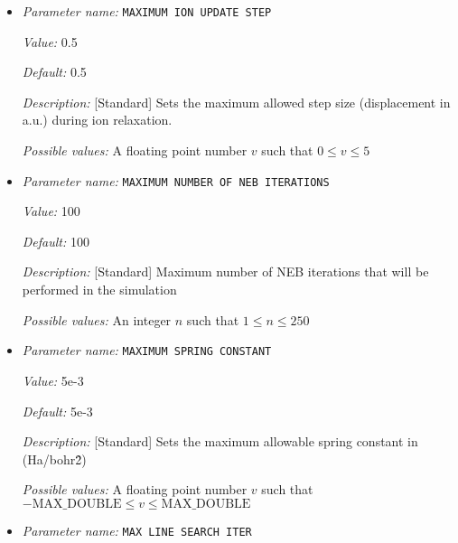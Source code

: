 \begin{itemize}
{\it Value:} 5


{\it Default:} 5


{\it Description:} [Standard] Number of previous steps to considered for the LBFGS update.


{\it Possible values:} An integer $n$ such that $1\leq n \leq 20$
\item {\it Parameter name:} {\tt MAXIMUM ION UPDATE STEP}
\label{parameters:NEB/MAXIMUM ION UPDATE STEP}
\label{parameters:NEB/MAXIMUM_20ION_20UPDATE_20STEP}


{\it Value:} 0.5


{\it Default:} 0.5


{\it Description:} [Standard] Sets the maximum allowed step size (displacement in a.u.) during ion relaxation.


{\it Possible values:} A floating point number $v$ such that $0 \leq v \leq 5$
\item {\it Parameter name:} {\tt MAXIMUM NUMBER OF NEB ITERATIONS}
\label{parameters:NEB/MAXIMUM NUMBER OF NEB ITERATIONS}
\label{parameters:NEB/MAXIMUM_20NUMBER_20OF_20NEB_20ITERATIONS}


{\it Value:} 100


{\it Default:} 100


{\it Description:} [Standard] Maximum number of NEB iterations that will be performed in the simulation


{\it Possible values:} An integer $n$ such that $1\leq n \leq 250$
\item {\it Parameter name:} {\tt MAXIMUM SPRING CONSTANT}
\label{parameters:NEB/MAXIMUM SPRING CONSTANT}
\label{parameters:NEB/MAXIMUM_20SPRING_20CONSTANT}


{\it Value:} 5e-3


{\it Default:} 5e-3


{\it Description:} [Standard] Sets the maximum allowable spring constant in (Ha/bohr\^2)


{\it Possible values:} A floating point number $v$ such that $-\text{MAX\_DOUBLE} \leq v \leq \text{MAX\_DOUBLE}$
\item {\it Parameter name:} {\tt MAX LINE SEARCH ITER}
\label{parameters:NEB/MAX LINE SEARCH ITER}
\label{parameters:NEB/MAX_20LINE_20SEARCH_20ITER}



\end{itemize}
